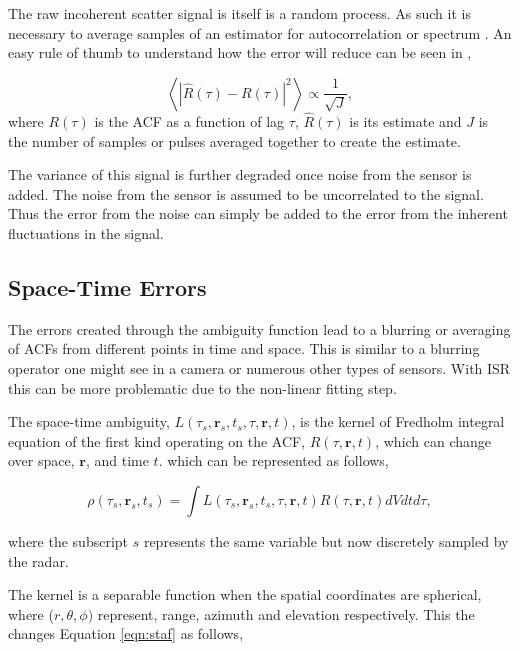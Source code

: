 \documentclass[draft,ras]{agutex}
\begin{document}
\begin{article}
The raw incoherent scatter signal is itself is a random process. As such it is necessary to average samples of an estimator for autocorrelation or spectrum \citep{Diaz:2008co}. An easy rule of thumb to understand how the error will reduce can be seen in \citet{farley1969},

\begin{equation}
\label{eqn:basicerror}
\left\langle \left| \hat{R}(\tau) -R(\tau) \right|^2 \right\rangle \propto \frac{1}{\sqrt{J}},
\end{equation}
\noindent where $R(\tau)$ is the ACF as a function of lag $\tau$, $\hat{R}(\tau)$ is its estimate and $J$ is the number of samples or pulses averaged together to create the estimate. 

The variance of this signal is further degraded once noise from the sensor is added. The noise from the sensor is assumed to be uncorrelated to the signal. Thus the error from the noise can simply be added to the error from the inherent fluctuations in the signal. 

\subsection{Space-Time Errors}

The errors created through the ambiguity function lead to a blurring or averaging of ACFs from different points in time and space. This is similar to a blurring operator one might see in a camera or numerous other types of sensors. With ISR this can be more problematic due to the non-linear fitting step.

The space-time ambiguity, $L(\tau_s,\mathbf{r}_s,t_s,\tau,\mathbf{r},t)$, is the kernel of Fredholm integral equation of the first kind operating on the ACF, $R(\tau,\mathbf{r},t)$, which can change over space, $\mathbf{r}$, and time $t$. which can be represented as follows,

 \begin{equation}
  \label{eqn:staf}
  \rho(\tau_s,\mathbf{r}_s,t_s) =\int L(\tau_s,\mathbf{r}_s,t_s,\tau,\mathbf{r},t)R(\tau,\mathbf{r},t)dVdtd\tau,
\end{equation}

\noindent where the subscript $s$ represents the same variable but now discretely sampled by the radar. 

The kernel is a separable function when the spatial coordinates are spherical, where ($r,\theta,\phi)$ represent, range, azimuth and elevation respectively. This the changes Equation \ref{eqn:staf} as follows,


\end{article}
\end{document}
